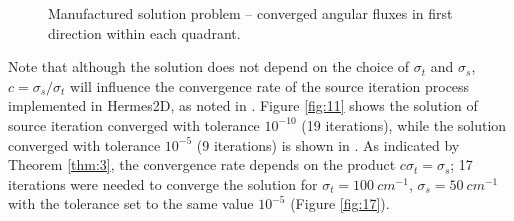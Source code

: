 \begin{figure}[h!]
\ContinuedFloat
\centering
\hspace{1em}
  \caption[Manufactured solution problem -- converged angular fluxes]{Manufactured solution problem -- converged angular
  fluxes in first direction within each quadrant.}
  \label{fig:12} 
\end{figure}

Note that although the solution does 
not depend on the choice of $\sigma_t$ and $\sigma_s$, $c = \sigma_s / \sigma_t$ will influence the convergence rate of 
the source iteration process implemented in Hermes2D, as noted in .
Figure \ref{fig:11} shows the solution of source iteration converged with tolerance $10^{-10}$ (19 iterations),
while the solution converged with tolerance $10^{-5}$ (9 iterations) is shown in . As indicated by
Theorem \ref{thm:3}, the convergence rate depends on the product $c\sigma_t = \sigma_s$; 17 iterations were needed to
converge the solution for $\sigma_t = \SI{100}{cm^{-1}}$, $\sigma_s = \SI{50}{cm^{-1}}$ with the tolerance set to the
same value $10^{-5}$ (Figure \ref{fig:17}).

